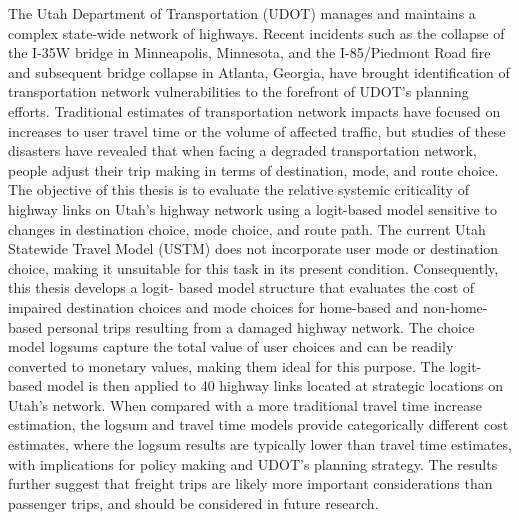 \afterpage{\cleardoublepage}


The Utah Department of Transportation (UDOT) manages and maintains a complex
state-wide network of highways. Recent incidents such as the collapse of the I-35W bridge in Minneapolis, Minnesota, and the I-85/Piedmont Road fire and subsequent bridge collapse in Atlanta, Georgia, have brought identification of transportation network vulnerabilities to the forefront of UDOT’s planning efforts. Traditional estimates of transportation network impacts have focused on increases to user travel time or the volume of affected traffic, but studies of these disasters have revealed that when facing a degraded transportation network, people adjust their trip making in terms of destination, mode, and route choice. The objective of this thesis is to evaluate the relative systemic criticality of highway links on Utah’s highway network using a logit-based model sensitive to changes in destination choice, mode choice, and route path. The current Utah Statewide Travel Model (USTM) does not incorporate user mode or destination choice, making it unsuitable for this task in its present condition. Consequently, this thesis develops a logit- based model structure that evaluates the cost of impaired destination choices and mode choices for home-based and non-home-based personal trips resulting from a damaged highway network. The choice model logsums capture the total value of user choices and can be readily converted to monetary values, making them ideal for this purpose. The logit-based model is then applied to 40 highway links located at strategic locations on Utah’s network. When compared with a more traditional travel time increase estimation, the logsum and travel time models provide categorically different cost estimates, where the logsum results are typically lower than travel time estimates, with implications for policy making and UDOT’s planning strategy. The results further suggest that freight trips are likely more important considerations than passenger trips, and should be considered in future research.
